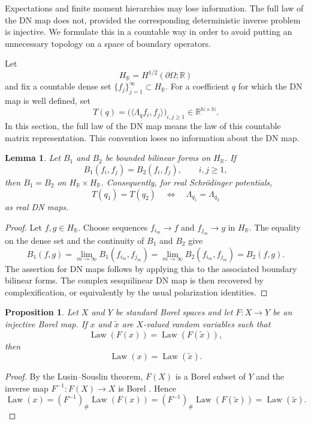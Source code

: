 \documentclass[11pt]{article}
\newcommand{\OmegaD}{\Omega}
\newcommand{\R}{\mathbb R}
\newcommand{\Law}{\operatorname{Law}}
\newcommand{\la}{\langle}
\newcommand{\ra}{\rangle}
\theoremstyle{plain}
\newtheorem{proposition}[theorem]{Proposition}
\newtheorem{lemma}[theorem]{Lemma}
\theoremstyle{definition}
\theoremstyle{remark}
\begin{document}
Expectations and finite moment hierarchies may lose information.  The full law of the DN map does not, provided the corresponding deterministic inverse problem is injective.  We formulate this in a countable way in order to avoid putting an unnecessary topology on a space of boundary operators.

Let
\[
  H_\R=H^{1/2}(\partial\OmegaD;\R)
\]
and fix a countable dense set $\{f_j\}_{j=1}^\infty\subset H_\R$.  For a coefficient $q$ for which the DN map is well defined, set
\[
  T(q)=\big(\la\Lambda_q f_i,f_j\ra\big)_{i,j\ge1}
  \in\R^{\mathbb N\times\mathbb N}.
\]
In this section, the full law of the DN map means the law of this countable matrix representation.  This convention loses no information about the DN map.

\begin{lemma}\label{lem:countable-DN-representation}
Let $B_1$ and $B_2$ be bounded bilinear forms on $H_\R$.  If
\[
  B_1(f_i,f_j)=B_2(f_i,f_j),\qquad i,j\ge1,
\]
then $B_1=B_2$ on $H_\R\times H_\R$.  Consequently, for real Schr\"odinger potentials,
\[
  T(q_1)=T(q_2)
  \quad\Longleftrightarrow\quad
  \Lambda_{q_1}=\Lambda_{q_2}
\]
as real DN maps.
\end{lemma}

\begin{proof}
Let $f,g\in H_\R$.  Choose sequences $f_{i_m}\to f$ and $f_{j_m}\to g$ in $H_\R$.  The equality on the dense set and the continuity of $B_1$ and $B_2$ give
\[
  B_1(f,g)=\lim_{m\to\infty}B_1(f_{i_m},f_{j_m})
  =\lim_{m\to\infty}B_2(f_{i_m},f_{j_m})=B_2(f,g).
\]
The assertion for DN maps follows by applying this to the associated boundary bilinear forms.  The complex sesquilinear DN map is then recovered by complexification, or equivalently by the usual polarization identities.
\end{proof}

\begin{proposition}\label{prop:injective-observable-law-coeff}
Let $X$ and $Y$ be standard Borel spaces and let $F:X\to Y$ be an injective Borel map.  If $x$ and $\widetilde x$ are $X$-valued random variables such that
\[
  \Law(F(x))=\Law(F(\widetilde x)),
\]
then
\[
  \Law(x)=\Law(\widetilde x).
\]
\end{proposition}

\begin{proof}
By the Lusin--Souslin theorem, $F(X)$ is a Borel subset of $Y$ and the inverse map $F^{-1}:F(X)\to X$ is Borel \cite[Theorem~15.1]{Kechris1995}.  Hence
\[
  \Law(x)=(F^{-1})_\#\Law(F(x))
  =(F^{-1})_\#\Law(F(\widetilde x))=\Law(\widetilde x).
\]
\end{proof}
\end{document}
